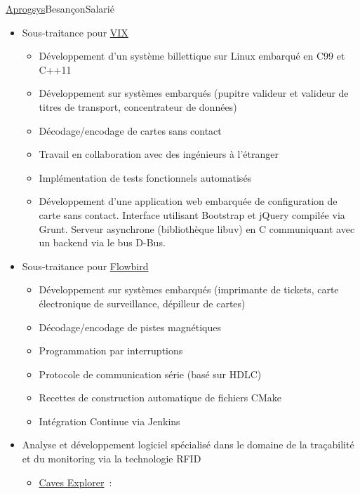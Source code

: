 \documentclass[12pt,a4paper,sans]{moderncv}
\begin{document}
{\href{https://www.aprogsys.com/}{Aprogsys}}{Besançon}{Salarié}{%
 \begin{itemize}
  \item Sous-traitance pour \href{http://vixtechnology.com/}{VIX}
        \begin{itemize}
         \item Développement d'un système billettique sur Linux embarqué
               en C99 et C++11
         \item Développement sur systèmes embarqués (pupitre valideur et
               valideur de titres de transport, concentrateur de données)
         \item Décodage/encodage de cartes sans contact
         \item Travail en collaboration avec des ingénieurs à l'étranger
         \item Implémentation de tests fonctionnels automatisés
         \item Développement d'une application web embarquée de configuration
               de carte sans contact.
               Interface utilisant Bootstrap et jQuery compilée via Grunt.
               Serveur asynchrone (bibliothèque libuv) en C communiquant avec
               un backend via le bus D-Bus.
        \end{itemize}
  \item Sous-traitance pour \href{http://flowbird.group/}{Flowbird}
        \begin{itemize}
         \item Développement sur systèmes embarqués (imprimante de tickets,
               carte électronique de surveillance, dépilleur de cartes)
         \item Décodage/encodage de pistes magnétiques
         \item Programmation par interruptions
         \item Protocole de communication série (basé sur HDLC)
         \item Recettes de construction automatique de fichiers CMake
         \item Intégration Continue via Jenkins
        \end{itemize}
  \item Analyse et développement logiciel spécialisé dans le domaine
        de la traçabilité et du monitoring via la technologie RFID
        \begin{itemize}
         \item \href{http://www.caves-explorer.com/}{Caves Explorer}~:

\end{itemize}
\end{itemize}}
\end{document}
